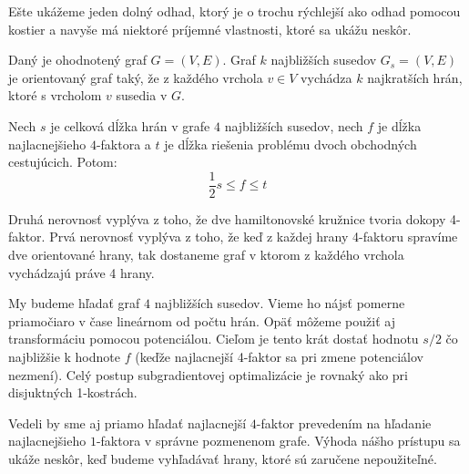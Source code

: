 Ešte ukážeme jeden dolný odhad, ktorý je o trochu rýchlejší ako odhad pomocou kostier a navyše má
niektoré príjemné vlastnosti, ktoré sa ukážu neskôr.

\begin{definicia}
Daný je ohodnotený graf $G = (V, E)$. Graf $k$ najbližších susedov $G_s = (V, E)$ je orientovaný
graf taký, že z každého vrchola $v \in V$ vychádza $k$ najkratších hrán, ktoré s vrcholom $v$
susedia v $G$. 
\end{definicia}

\begin{lema}
Nech $s$ je celková dĺžka hrán v grafe $4$ najbližších susedov, nech $f$ je dĺžka najlacnejšieho
$4$-faktora a $t$ je dĺžka riešenia problému dvoch obchodných cestujúcich. Potom:
$$ \frac{1}{2} s \leq f \leq t$$
\end{lema}

\begin{dokaz}
Druhá nerovnosť vyplýva z toho, že dve hamiltonovské kružnice tvoria dokopy 4-faktor.
Prvá nerovnosť vyplýva z toho, že keď z každej hrany 4-faktoru spravíme dve orientované hrany, tak
dostaneme graf v ktorom z každého vrchola vychádzajú práve 4 hrany.
\end{dokaz}

My budeme hľadať graf $4$ najbližších susedov. Vieme ho nájsť pomerne priamočiaro v čase lineárnom
od počtu hrán. Opäť môžeme použiť aj transformáciu pomocou potenciálou. Cieľom je tento krát
dostať hodnotu $s/2$ čo najbližšie k hodnote $f$ (keďže najlacnejší 4-faktor sa pri zmene
potenciálov nezmení). Celý postup subgradientovej optimalizácie je rovnaký ako pri disjuktných
1-kostrách.

\begin{poznamka}
Vedeli by sme aj priamo hľadať najlacnejší $4$-faktor prevedením na hľadanie najlacnejšieho
$1$-faktora v správne pozmenenom grafe. Výhoda nášho prístupu sa ukáže neskôr, keď budeme
vyhľadávať hrany, ktoré sú zaručene nepoužiteľné.
\end{poznamka}


